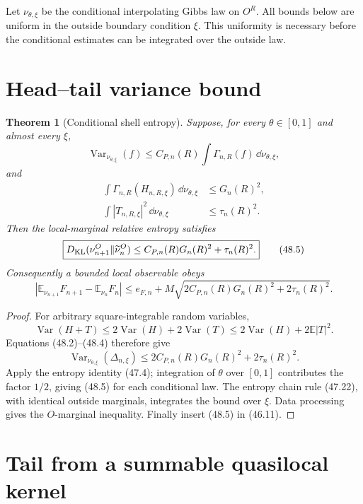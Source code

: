 \documentclass[11pt]{article}
\newtheorem{theorem}{Theorem}[section]
\theoremstyle{remark}
\begin{document}
Let \(\nu_{\theta,\xi}\) be the conditional interpolating Gibbs law
on \(O^R\).  All bounds below are uniform in the outside boundary
condition \(\xi\).  This uniformity is necessary before the
conditional estimates can be integrated over the outside law.

\section{Head--tail variance bound}

\begin{theorem}[Conditional shell entropy]
\label{thm:v15v48-shell-entropy}
Suppose, for every \(\theta\in[0,1]\) and almost every \(\xi\),
\[
 \operatorname{Var}_{\nu_{\theta,\xi}}(f)
 \leq C_{P,n}(R)
 \int\Gamma_{n,R}(f)\,\dd\nu_{\theta,\xi},              \tag{48.2}
\]
and
\begin{align}
 \int\Gamma_{n,R}(H_{n,R,\xi})\,\dd\nu_{\theta,\xi}
 &\leq G_n(R)^2,                                        \tag{48.3}\\
 \int|T_{n,R,\xi}|^2\,\dd\nu_{\theta,\xi}
 &\leq\tau_n(R)^2.                                      \tag{48.4}
\end{align}
Then the local-marginal relative entropy satisfies
\[
 \boxed{
 D_{\rm KL}(\nu_{n+1}^O\Vert\widetilde\nu_n^O)
 \leq C_{P,n}(R)G_n(R)^2+\tau_n(R)^2.}                  \tag{48.5}
\]
Consequently a bounded local observable obeys
\[
 \left|\mathbb E_{\nu_{n+1}}F_{n+1}
       -\mathbb E_{\nu_n}F_n\right|
 \leq e_{F,n}
 +M\sqrt{2C_{P,n}(R)G_n(R)^2+2\tau_n(R)^2}.             \tag{48.6}
\]
\end{theorem}

\begin{proof}
For arbitrary square-integrable random variables,
\[
 \operatorname{Var}(H+T)
 \leq2\operatorname{Var}(H)+2\operatorname{Var}(T)
 \leq2\operatorname{Var}(H)+2\mathbb E|T|^2.            \tag{48.7}
\]
Equations (48.2)--(48.4) therefore give
\[
 \operatorname{Var}_{\nu_{\theta,\xi}}(\Delta_{n,\xi})
 \leq2C_{P,n}(R)G_n(R)^2+2\tau_n(R)^2.                  \tag{48.8}
\]
Apply the entropy identity (47.4); integration of \(\theta\) over
\([0,1]\) contributes the factor \(1/2\), giving (48.5) for each
conditional law.  The entropy chain rule (47.22), with identical
outside marginals, integrates the bound over \(\xi\).  Data
processing gives the \(O\)-marginal inequality.  Finally insert
(48.5) in (46.11).
\end{proof}

\section{Tail from a summable quasilocal kernel}
\end{document}
